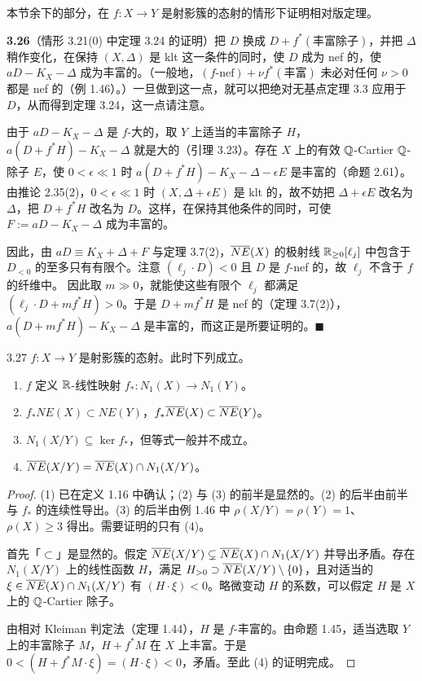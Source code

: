 本节余下的部分，在 $f:X\to Y$ 是射影簇的态射的情形下证明相对版定理。

\par\medskip\noindent\textbf{3.26}（情形 3.21(0) 中定理 3.24 的证明）\quad 把 $D$ 换成 $D+f^*(\text{丰富除子})$，并把 $\Delta$ 稍作变化，在保持 $(X,\Delta)$ 是 klt 这一条件的同时，使 $D$ 成为 nef 的，使 $aD-K_X-\Delta$ 成为丰富的。（一般地，$(f\text{-nef})+\nu f^*(\text{丰富})$ 未必对任何 $\nu>0$ 都是 nef 的（例 1.46）。）一旦做到这一点，就可以把绝对无基点定理 3.3 应用于 $D$，从而得到定理 3.24，这一点请注意。

由于 $aD-K_X-\Delta$ 是 $f$-大的，取 $Y$ 上适当的丰富除子 $H$，$a(D+f^*H)-K_X-\Delta$ 就是大的（引理 3.23）。存在 $X$ 上的有效 $\mathbb{Q}$-Cartier $\mathbb{Q}$-除子 $E$，使 $0<\epsilon\ll 1$ 时 $a(D+f^*H)-K_X-\Delta-\epsilon E$ 是丰富的（命题 2.61）。由推论 2.35(2)，$0<\epsilon\ll 1$ 时 $(X,\Delta+\epsilon E)$ 是 klt 的，故不妨把 $\Delta+\epsilon E$ 改名为 $\Delta$，把 $D+f^*H$ 改名为 $D$。这样，在保持其他条件的同时，可使 $F:=aD-K_X-\Delta$ 成为丰富的。

因此，由 $aD\equiv K_X+\Delta+F$ 与定理 3.7(2)，$\overline{NE}(X)$ 的极射线 $\mathbb{R}_{\ge 0}[\ell_j]$ 中包含于 $D_{<0}$ 的至多只有有限个。注意 $(\ell_j\cdot D)<0$ 且 $D$ 是 $f$-nef 的，故 $\ell_j$ 不含于 $f$ 的纤维中。
因此取 $m\gg 0$，就能使这些有限个 $\ell_j$ 都满足 $(\ell_j\cdot D+mf^*H)>0$。于是 $D+mf^*H$ 是 nef 的（定理 3.7(2)），$a(D+mf^*H)-K_X-\Delta$ 是丰富的，而这正是所要证明的。\hfill$\blacksquare$

\begin{propositionp}{3.27}
$f:X\to Y$ 是射影簇的态射。此时下列成立。
\begin{enumerate}[label=（\arabic*）,leftmargin=2.8em,itemsep=1pt,topsep=2pt,parsep=0pt]
\item $f$ 定义 $\mathbb{R}$-线性映射 $f_*:N_1(X)\to N_1(Y)$。
\item $f_*NE(X)\subset NE(Y)$，$f_*\overline{NE}(X)\subset\overline{NE}(Y)$。
\item $N_1(X/Y)\subseteq\ker f_*$，但等式一般并不成立。
\item $\overline{NE}(X/Y)=\overline{NE}(X)\cap N_1(X/Y)$。
\end{enumerate}
\end{propositionp}

\begin{proof}
(1) 已在定义 1.16 中确认；(2) 与 (3) 的前半是显然的。(2) 的后半由前半与 $f_*$ 的连续性导出。(3) 的后半由例 1.46 中 $\rho(X/Y)=\rho(Y)=1$、$\rho(X)\ge 3$ 得出。需要证明的只有 (4)。

首先「$\subset$」是显然的。假定 $\overline{NE}(X/Y)\subsetneq\overline{NE}(X)\cap N_1(X/Y)$ 并导出矛盾。存在 $N_1(X/Y)$ 上的线性函数 $H$，满足 $H_{>0}\supset\overline{NE}(X/Y)\setminus\{0\}$，且对适当的 $\xi\in\overline{NE}(X)\cap N_1(X/Y)$ 有 $(H\cdot\xi)<0$。略微变动 $H$ 的系数，可以假定 $H$ 是 $X$ 上的 $\mathbb{Q}$-Cartier 除子。

由相对 Kleiman 判定法（定理 1.44），$H$ 是 $f$-丰富的。由命题 1.45，适当选取 $Y$ 上的丰富除子 $M$，$H+f^*M$ 在 $X$ 上丰富。于是 $0<(H+f^*M\cdot\xi)=(H\cdot\xi)<0$，矛盾。至此 (4) 的证明完成。
\end{proof}


